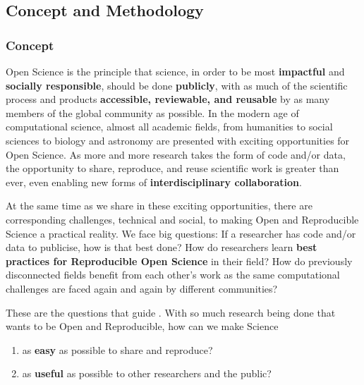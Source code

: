 
\subsection{Concept and Methodology}\label{sec:concept_methodology}


\subsubsection{Concept}\label{sec:concept}

Open Science is the principle that science, in order to be most
\textbf{impactful} and \textbf{socially responsible}, should be done \textbf{publicly}, with as
much of the scientific process and products \textbf{accessible, reviewable,
and reusable} by as many members of the global community as possible.
In the modern age of computational science, almost all academic
fields, from humanities to social sciences to biology and astronomy
are presented with exciting opportunities for Open Science.  As more and
more research takes the form of code and/or data, the opportunity to
share, reproduce, and reuse scientific work is greater than ever, even
enabling new forms of \textbf{interdisciplinary collaboration}.


At the same time as we share in these exciting opportunities, there
are corresponding challenges, technical and social, to making Open
and Reproducible Science a practical reality.  We face big questions: If a researcher
has code and/or data to publicise, how is that best done?  How do
researchers learn \textbf{best practices for Reproducible Open Science} in their field?  How do
previously disconnected fields benefit from each other's work as the
same computational challenges are faced again and again by different
communities?

These are the questions that guide \TheProject.
With so much research being done that wants to be Open and Reproducible,
how can we make Science

\begin{enumerate}
    \item as \textbf{easy} as possible to share and reproduce?
    \item as \textbf{useful} as possible to other researchers and the public?
\end{enumerate}

